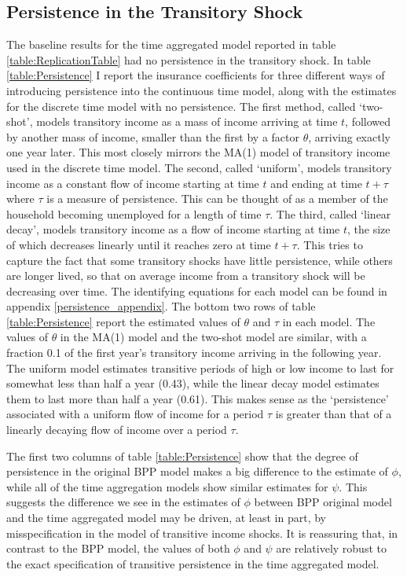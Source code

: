 \documentclass[AER]{AEA}
\begin{document}


\subsection{Persistence in the Transitory Shock} \label{persistence}
The baseline results for the time aggregated model reported in table \ref{table:ReplicationTable} had no persistence in the transitory shock. In table \ref{table:Persistence} I report the insurance coefficients for three different ways of introducing persistence into the continuous time model, along with the estimates for the discrete time model with no persistence. The first method, called `two-shot', models transitory income as a mass of income arriving at time $t$, followed by another mass of income, smaller than the first by a factor $\theta$, arriving exactly one year later. This most closely mirrors the MA(1) model of transitory income used in the discrete time model. The second, called `uniform', models transitory income as a constant flow of income starting at time $t$ and ending at time $t+\tau$ where $\tau$ is a measure of persistence. This can be thought of as a member of the household becoming unemployed for a length of time $\tau$. The third, called `linear decay', models transitory income as a flow of income starting at time $t$, the size of which decreases linearly until it reaches zero at time $t+\tau$. This tries to capture the fact that some transitory shocks have little persistence, while others are longer lived, so that on average income from a transitory shock will be decreasing over time. The identifying equations for each model can be found in appendix \ref{persistence_appendix}. The bottom two rows of table \ref{table:Persistence} report the estimated values of $\theta$ and $\tau$ in each model. The values of $\theta$ in the MA(1) model and the two-shot model are similar, with a fraction 0.1 of the first year's transitory income arriving in the following year. The uniform model estimates transitive periods of high or low income to last for somewhat less than half a year (0.43), while the linear decay model estimates them to last more than half a year (0.61). This makes sense as the `persistence' associated with a uniform flow of income for a period $\tau$ is greater than that of a linearly decaying flow of income over a period $\tau$.

The first two columns of table \ref{table:Persistence} show that the degree of persistence in the original BPP model makes a big difference to the estimate of $\phi$, while all of the time aggregation models show similar estimates for $\psi$. This suggests the difference we see in the estimates of $\phi$ between BPP original model and the time aggregated model may be driven, at least in part, by misspecification in the model of transitive income shocks. It is reassuring that, in contrast to the BPP model, the values of both $\phi$ and $\psi$ are relatively robust to the exact specification of transitive persistence in the time aggregated model.
\end{document}
